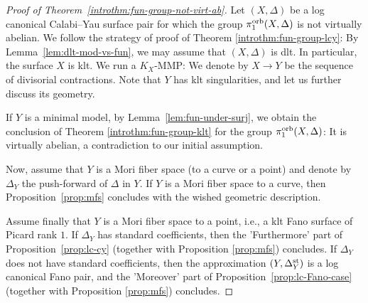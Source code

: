\documentclass{amsart}
\theoremstyle{definition}
\theoremstyle{remark}
\numberwithin{equation}{section}
\begin{document}
\begin{proof}[Proof of Theorem~\ref{introthm:fun-group-not-virt-ab}]
Let $(X,\Delta)$ be a log canonical Calabi--Yau surface pair for which the group $\pi_1^{\rm orb}(X,\Delta)$ is not virtually abelian. We follow the strategy of proof of Theorem \ref{introthm:fun-group-lcy}: By Lemma~\ref{lem:dlt-mod-vs-fun}, we may assume that $(X,\Delta)$ is dlt. In particular, the surface $X$ is klt.
We run a $K_X$-MMP: We denote by $X\rightarrow Y$ be the sequence of divisorial contractions. Note that $Y$ has klt singularities, and let us further discuss its geometry.

If $Y$ is a minimal model, by Lemma~\ref{lem:fun-under-surj}, we obtain the conclusion of Theorem \ref{introthm:fun-group-klt} for the group $\pi_1^{\rm orb}(X,\Delta)$: It is virtually abelian, a contradiction to our initial assumption.

Now, assume that $Y$ is a Mori fiber space (to a curve or a point) and denote by $\Delta_Y$ the push-forward of $\Delta$ in $Y$.
If $Y$ is a Mori fiber space to a curve, then Proposition~\ref{prop:mfs} concludes with the wished geometric description.

Assume finally that $Y$ is a Mori fiber space to a point, i.e., a klt Fano surface of Picard rank $1$. If $\Delta_Y$ has standard coefficients, then the 'Furthermore' part of Proposition~\ref{prop:lc-cy} (together with Proposition \ref{prop:mfs}) concludes. If $\Delta_Y$ does not have standard coefficients, then the approximation $(Y,\Delta_Y^{\rm st})$ is a log canonical Fano pair, and the 'Moreover' part of Proposition~\ref{prop:lc-Fano-case} (together with Proposition \ref{prop:mfs}) concludes.
\end{proof}
\end{document}
